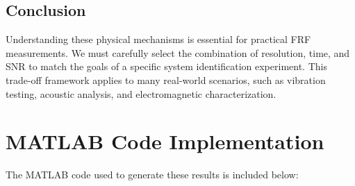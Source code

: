 \documentclass[a4paper,12pt]{article}
\begin{document}
\subsection*{Conclusion}
Understanding these physical mechanisms is essential for practical FRF measurements. We must carefully select the combination of resolution, time, and SNR to match the goals of a specific system identification experiment. This trade-off framework applies to many real-world scenarios, such as vibration testing, acoustic analysis, and electromagnetic characterization.
\section*{MATLAB Code Implementation}
The MATLAB code used to generate these results is included below:

\lstset{language=Matlab, basicstyle=\ttfamily\small, breaklines=true}
\end{document}
